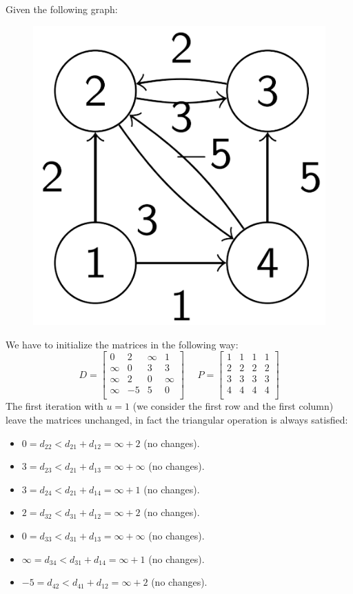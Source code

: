 \documentclass[12pt, a4paper]{report}
\begin{document}
    \begin{example}
        Given the following graph: 
        \begin{figure}[H]
            \centering
            \includegraphics[width=0.25\linewidth]{images/floyd.png}
        \end{figure}
        We have to initialize the matrices in the following way: 
        \[D=\begin{bmatrix}
            0 & 2 & \infty & 1 \\
            \infty & 0 & 3 & 3 \\
            \infty & 2 & 0 & \infty \\
            \infty & -5 & 5 & 0 \\
        \end{bmatrix}
        \:\:\:\:\:\:
        P=\begin{bmatrix}
            1 & 1 & 1 & 1 \\
            2 & 2 & 2 & 2 \\
            3 & 3 & 3 & 3 \\
            4 & 4 & 4 & 4 \\
        \end{bmatrix}
        \]
        The first iteration with $u=1$ (we consider the first row and the first column) leave the matrices unchanged, in fact the triangular operation is always satisfied: 
        \begin{itemize}
            \item $0=d_{22} < d_{21} + d_{12} = \infty + 2$ (no changes). 
            \item $3=d_{23} < d_{21} + d_{13} = \infty + \infty$ (no changes). 
            \item $3=d_{24} < d_{21} + d_{14} = \infty + 1$ (no changes). 
            \item $2=d_{32} < d_{31} + d_{12} = \infty + 2$ (no changes). 
            \item $0=d_{33} < d_{31} + d_{13} = \infty + \infty$ (no changes). 
            \item $\infty=d_{34} < d_{31} + d_{14} = \infty + 1$ (no changes). 
            \item $-5=d_{42} < d_{41} + d_{12} = \infty + 2$ (no changes). 

\end{itemize}
\end{example}
\end{document}
